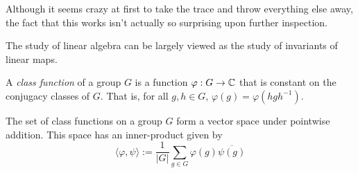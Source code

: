 Although it seems crazy at first to take the trace and throw everything else away, the fact that this works isn't 
actually so surprising upon further inspection.

    






The study of linear algebra can be largely viewed as the study of invariants of linear maps. 
\begin{definition}
    A \emph{class function} of a group $G$ is a function $\varphi : G \rightarrow \mathbb{C}$ that is constant on the 
    conjugacy classes of $G$. That is, for all $g,h \in G$, $\varphi(g) = \varphi(hgh^{-1})$.
    
    The set of class functions on a group $G$ form a vector space under pointwise addition. This space has an 
    inner-product given by
    \[
        \langle \varphi, \psi \rangle := \frac{1}{|G|} \sum_{g \in G} \varphi(g)\overline{\psi(g)}
    \]
\end{definition}


